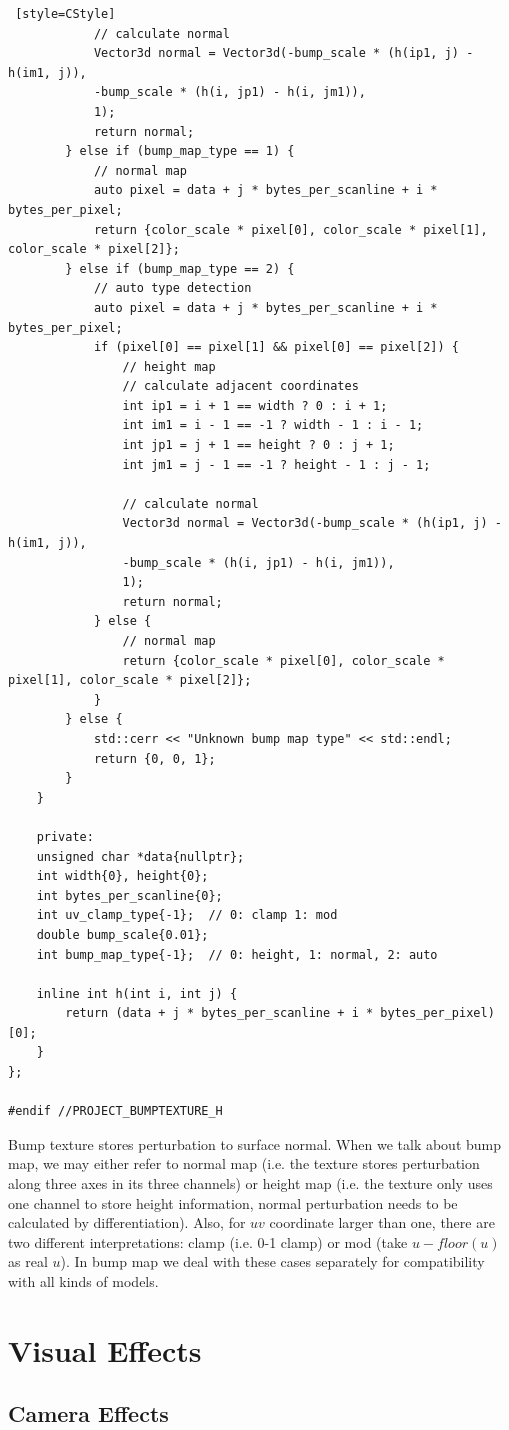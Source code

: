 \documentclass[utf8]{article}
\begin{document}
\begin{lstlisting} [style=CStyle]
			// calculate normal
			Vector3d normal = Vector3d(-bump_scale * (h(ip1, j) - h(im1, j)),
			-bump_scale * (h(i, jp1) - h(i, jm1)),
			1);
			return normal;
		} else if (bump_map_type == 1) {
			// normal map
			auto pixel = data + j * bytes_per_scanline + i * bytes_per_pixel;
			return {color_scale * pixel[0], color_scale * pixel[1], color_scale * pixel[2]};
		} else if (bump_map_type == 2) {
			// auto type detection
			auto pixel = data + j * bytes_per_scanline + i * bytes_per_pixel;
			if (pixel[0] == pixel[1] && pixel[0] == pixel[2]) {
				// height map
				// calculate adjacent coordinates
				int ip1 = i + 1 == width ? 0 : i + 1;
				int im1 = i - 1 == -1 ? width - 1 : i - 1;
				int jp1 = j + 1 == height ? 0 : j + 1;
				int jm1 = j - 1 == -1 ? height - 1 : j - 1;
				
				// calculate normal
				Vector3d normal = Vector3d(-bump_scale * (h(ip1, j) - h(im1, j)),
				-bump_scale * (h(i, jp1) - h(i, jm1)),
				1);
				return normal;
			} else {
				// normal map
				return {color_scale * pixel[0], color_scale * pixel[1], color_scale * pixel[2]};
			}
		} else {
			std::cerr << "Unknown bump map type" << std::endl;
			return {0, 0, 1};
		}
	}
	
	private:
	unsigned char *data{nullptr};
	int width{0}, height{0};
	int bytes_per_scanline{0};
	int uv_clamp_type{-1};  // 0: clamp 1: mod
	double bump_scale{0.01};
	int bump_map_type{-1};  // 0: height, 1: normal, 2: auto
	
	inline int h(int i, int j) {
		return (data + j * bytes_per_scanline + i * bytes_per_pixel)[0];
	}
};

#endif //PROJECT_BUMPTEXTURE_H

\end{lstlisting}
Bump texture stores perturbation to surface normal. When we talk about bump map, we may either refer to normal map (i.e. the texture stores perturbation along three axes in its three channels) or height map (i.e. the texture only uses one channel to store height information, normal perturbation needs to be calculated by differentiation). Also, for $uv$ coordinate larger than one, there are two different interpretations: clamp (i.e. 0-1 clamp) or mod (take $u-floor(u)$ as real $u$). In bump map we deal with these cases separately for compatibility with all kinds of models.

\section{Visual Effects}
\subsection{Camera Effects}
\end{document}
